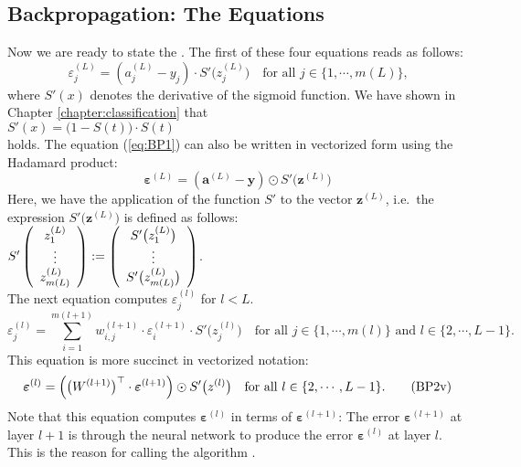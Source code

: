 \subsection{Backpropagation: The Equations}
Now we are ready to state the .  The first of these four equations reads as follows:
\begin{equation}
  \label{eq:BP1}
  \varepsilon^{(L)}_j = (a_j^{(L)} - y_j) \cdot S'\bigl(z_j^{(L)}\bigr)
 \quad \mbox{for all $j \in \{1, \cdots, m(L)\}$,}
  \tag{BP1}
\end{equation}
where $S'(x)$ denotes the derivative of the sigmoid function.  We have shown in Chapter
\ref{chapter:classification} that
\\[0.2cm]
\hspace*{1.3cm}
$S'(x) = \bigl(1 - S(t)\bigr) \cdot S(t)$
\\[0.2cm]
holds.  The equation (\ref{eq:BP1}) can also be written in vectorized form using the Hadamard product:
\begin{equation}
  \label{eq:BP1s}
\boldsymbol{\varepsilon}^{(L)} = (\mathbf{a}^{(L)} - \mathbf{y}) \odot S'\bigl(\mathbf{z}^{(L)}\bigr)  
\tag{BP1v}
\end{equation}
Here, we have  the application of the function $S'$ to the vector $\mathbf{z}^{(L)}$, i.e.~the
expression $S'\bigl(\mathbf{z}^{(L)}\bigr)$ is defined as follows:
\\[0.2cm]
\hspace*{1.3cm}
$ S'\left(
  \begin{array}[c]{c}
   z_1^{(L)}      \\
   \vdots       \\
   z_{m(L)}^{(L)} 
  \end{array}
  \right) := \left(
  \begin{array}[c]{c}
   S'\bigl(z_1^{(L)}\bigr)      \\
   \vdots       \\
   S'\bigl(z_{m(L)}^{(L)}\bigr)
  \end{array}
  \right)
$.
\\[0.2cm]
The next equation computes $\varepsilon_j^{(l)}$ for $l < L$.  
\begin{equation}
  \label{eq:BP2}
  \varepsilon^{(l)}_j = \sum\limits_{i=1}^{m(l+1)} w_{i,j}^{(l+1)} \cdot \varepsilon^{(l+1)}_i \cdot
  S'\bigl(z^{(l)}_j\bigr) \quad \mbox{for all $j \in \{1, \cdots, m(l)\}$ and $l \in \{2, \cdots, L-1\}$}.
  \tag{BP2}
\end{equation}
This equation is more succinct in vectorized notation:
\begin{equation}
  \label{eq:BP2v}
  \boldsymbol{\varepsilon}^{(l)} = \Bigl(\bigl(W^{(l+1)}\bigr)^\top \cdot \boldsymbol{\varepsilon}^{(l+1)}\Bigr) \odot
  S'\bigl(z^{(l)}\bigr) \quad \mbox{for all $l \in \{2, \cdots, L-1\}$}.
  \tag{BP2v}
\end{equation}
Note that this equation computes $\boldsymbol{\varepsilon}^{(l)}$ in terms of  $\boldsymbol{\varepsilon}^{(l+1)}$:  The error 
$\boldsymbol{\varepsilon}^{(l+1)}$ at layer $l+1$ is  through the neural network to produce the
error $\boldsymbol{\varepsilon}^{(l)}$ at layer $l$.  This is the reason for calling the algorithm .

